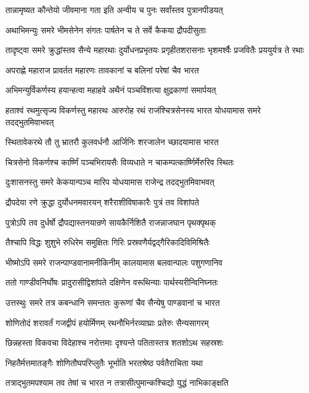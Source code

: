 \twolineshloka
{तान्नामृष्यत कौन्तेयो जीवमाना गता इति}
{अन्वीय च पुनः सर्वांस्तव पुत्रानपीडयत्}


\twolineshloka
{अथाभिमन्युः समरे भीमसेनेन संगतः}
{पार्षतेन च ते सर्वे कैकया द्रौपदीसुताः}


\threelineshloka
{तादृष्ट्वा समरे क्रुद्धांस्तव सैन्ये महारथाः}
{दुर्योधनप्रभृतयः प्रगृहीतशरासनाः}
{भृशमर्श्वैः प्रजवितैः प्रययुर्यत्र ते रथाः}


\twolineshloka
{अपराह्णे महाराज प्रावर्तत महारणः}
{तावकानां च बलिनां परेषां चैव भारत}


\twolineshloka
{अभिमन्युर्विकर्णस्य हयान्हत्वा महाहवे}
{अथैनं पञ्चविंशत्या क्षुद्रकाणां समार्पयत्}


\threelineshloka
{हताश्वं रथमुत्सृज्य विकर्णस्तु महारथः}
{आरुरोह रथं राजंश्चित्रसेनस्य भारत}
{योधयामास समरे तदद्भुतमिवाभवत्}


\twolineshloka
{स्थितावेकरथे तौ तु भ्रातरौ कुलवर्धनौ}
{आर्जिनिः शरजालेन च्छादयामास भारत}


\twolineshloka
{चित्रसेनो विकर्णश्च कार्ष्णिं पञ्चभिरायसैः}
{विव्यधाते न चाकम्पत्कार्ष्णिर्मेरुरिव स्थितः}


\twolineshloka
{दुःशासनस्तु समरे केकयान्पञ्च मारिप}
{योधयामास राजेन्द्र तदद्भुतमिवाभवत्}


\twolineshloka
{द्रौपदेया रणे क्रुद्धा दुर्योधनमवारयन्}
{शरैराशीविषाकारैः पुत्रं तव विशांपते}


\twolineshloka
{पुत्रोऽपि तव दुर्धर्षो द्रौपद्यास्तनयान्रणे}
{सायकैर्निशितै राजन्नाजघान पृथक्पृथक्}


\twolineshloka
{तैश्चापि विद्धः शुशुभे रुधिरेम समुक्षितः}
{गिरिः प्रस्रवणैर्यद्वद्गैरिकादिविमिश्रितैः}


\twolineshloka
{भीष्मोऽपि समरे राजन्पाण्डवानामनीकिनीम्}
{कालयामास बलवान्पालः पशुगणानिव}


\twolineshloka
{ततो गाण्डीवनिर्घोषः प्रादुरासीद्विशांपते}
{दक्षिणेन वरूथिन्याः पार्थस्यरीन्विनिघ्नतः}


\twolineshloka
{उत्तस्थुः समरे तत्र कबन्धानि समन्ततः}
{कुरूणां चैव सैन्येषु पाण्डवानां च भारत}


\twolineshloka
{शोणितोदं शरावर्तं गजद्वीपं हयोर्मिणम्}
{रथनौभिर्नरव्याघ्राः प्रतेरुः सैन्यसागरम्}


\twolineshloka
{छिन्नहस्ता विकवचा विदेहाश्च नरोत्तमाः}
{दृश्यन्ते पतितास्तत्र शतशोऽथ सहस्रशः}


\twolineshloka
{निहतैर्मत्तमातङ्गैः शोणितौघपरिप्लुतैः}
{भूर्भाति भरतश्रेष्ठ पर्वतैराचिता यथा}


\twolineshloka
{तत्राद्भुतमपश्याम तव तेषां च भारत}
{न तत्रासीत्पुमान्कश्चिद्यो युद्धं नाभिकाङ्क्षति}


